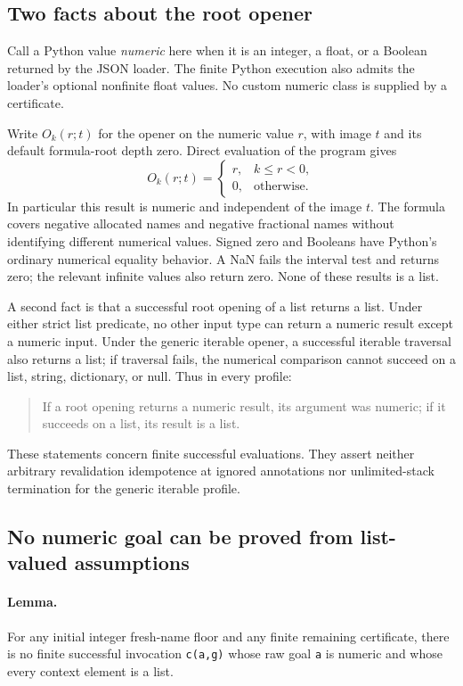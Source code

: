 \documentclass[11pt,letterpaper]{article}
\theoremstyle{definition}\newtheorem{definition}[theorem]{Definition}
\theoremstyle{remark}\newtheorem{remark}[theorem]{Remark}
\begin{document}
\subsection{Two facts about the root opener}

Call a Python value \emph{numeric} here when it is an integer, a float,
or a Boolean returned by the JSON loader.  The finite Python execution
also admits the loader's optional nonfinite float values.  No custom
numeric class is supplied by a certificate.

Write $O_k(r;t)$ for the opener on the numeric value $r$, with image $t$
and its default formula-root depth zero.  Direct evaluation of the
program gives
\[
 O_k(r;t)=
 \begin{cases}
 r,&k\le r<0,\\
 0,&\text{otherwise}.
 \end{cases}
 \tag{Root scalar}
\]
In particular this result is numeric and independent of the image $t$.
The formula covers negative allocated names and negative fractional
names without identifying different numerical values.  Signed zero and
Booleans have Python's ordinary numerical equality behavior.  A NaN
fails the interval test and returns zero; the relevant infinite values
also return zero.  None of these results is a list.

A second fact is that a successful root opening of a list returns a
list.  Under either strict list predicate, no other input type can
return a numeric result except a numeric input.  Under the generic
iterable opener, a successful iterable traversal also returns a list;
if traversal fails, the numerical comparison cannot succeed on a list,
string, dictionary, or null.  Thus in every profile:
\begin{quote}
If a root opening returns a numeric result, its argument was numeric;
if it succeeds on a list, its result is a list.
\end{quote}
These statements concern finite successful evaluations.  They assert
neither arbitrary revalidation idempotence at ignored annotations nor
unlimited-stack termination for the generic iterable profile.

\subsection{No numeric goal can be proved from list-valued assumptions}

\paragraph{Lemma.}
For any initial integer fresh-name floor and any finite remaining
certificate, there is no finite successful invocation
\texttt{c(a,g)} whose raw goal \texttt{a} is numeric and whose every
context element is a list.
\end{document}
